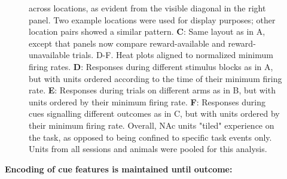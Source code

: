 \documentclass[11pt]{article}
\newcommand{\bsf}[1]{\textbf{#1}}
\begin{document}
{\begin{figure}[h]
{  across locations, as evident from the visible diagonal in the right panel. Two
  example locations were used for display purposes; other location pairs showed
  a similar pattern. \bsf{C}: Same layout as in A, except that panels now
  compare reward-available and reward-unavailable trials. D-F. Heat plots
  aligned to normalized minimum firing rates. \bsf{D}: Responses during
  different stimulus blocks as in A, but with units ordered according to the
  time of their minimum firing rate. \bsf{E}: Responses during trials on
  different arms as in B, but with units ordered by their minimum firing
  rate. \bsf{F}: Responses during cues signalling different outcomes as in C,
  but with units ordered by their minimum firing rate. Overall, NAc units
  "tiled" experience on the task, as opposed to being confined to specific task
  events only. Units from all sessions and animals were pooled for this
  analysis.}
\label{fig:tiling}
\end{figure}

{\bf Encoding of cue features is maintained until outcome:}

}
\end{document}
